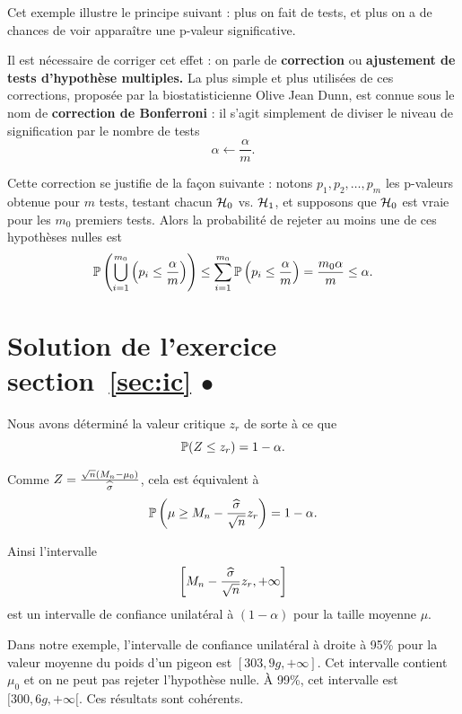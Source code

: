 Cet exemple illustre le principe suivant : plus on fait de tests, et plus on a
de chances de voir apparaître une p-valeur significative. 

Il est nécessaire de corriger cet effet : on parle de \textbf{correction} ou
\textbf{ajustement de tests d'hypothèse multiples.} La plus simple et plus
utilisées de ces corrections, proposée par la biostatisticienne Olive Jean
Dunn, est connue sous le nom de \textbf{correction de Bonferroni} : il s'agit
simplement de diviser le niveau de signification par le nombre de tests
\[
\alpha \leftarrow \frac{\alpha}{m}.
\]

Cette correction se justifie de la façon suivante : notons
$p_1, p_2, \dots, p_m$ les p-valeurs obtenue pour $m$ tests, testant chacun
$\mathcal{H}_0$ vs. $\mathcal{H}_1$, et supposons que $\mathcal{H}_0$ est vraie pour les $m_0$ premiers
tests. Alors la probabilité de rejeter au moins une de ces hypothèses nulles est
\[
\mathbb{P}\left(\bigcup_{i=1}^{m_0} \left( p_i \leq \frac{\alpha}{m} \right)\right)  \leq
\sum_{i=1}^{m_0} \mathbb{P} \left( p_i \leq \frac{\alpha}{m} \right)= \frac{m_0
	\alpha}{m} \leq \alpha.
\]



\section{Solution de l'exercice section~\ref{sec:ic} $\bullet$}
\label{sec:ic_sol}
Nous avons déterminé la valeur critique $z_r$ de sorte à ce que 
\[
\mathbb{P}(Z \leq z_r) = 1-\alpha.
\]

Comme $Z = \frac{\sqrt{n} (M_n - \mu_0)}{{\widehat \sigma}}$, cela est équivalent à 
\[
\mathbb{P} \left(\mu \geq M_n - \frac{{\widehat \sigma}}{\sqrt{n}} z_r \right) = 1 - \alpha.
\]

Ainsi l'intervalle 
\[
\left[M_n - \frac{{\widehat \sigma}}{\sqrt{n}} z_r, +\infty \right]
\]
est un intervalle de confiance unilatéral à $(1-\alpha)$ pour la taille moyenne $\mu$.

Dans notre exemple, l'intervalle de confiance unilatéral à droite à 95\% pour
la valeur moyenne du poids d'un pigeon est $[303,9\si{g}, +\infty]$. Cet
intervalle contient $\mu_0$ et on ne peut pas rejeter l'hypothèse nulle.  À
99\%, cet intervalle est $[300,6\si{g}, +\infty[.$ Ces résultats sont
cohérents.

